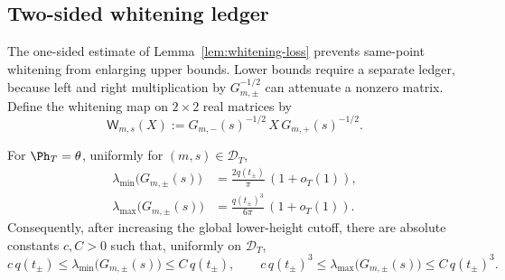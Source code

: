 %
%

\subsection{Two-sided whitening ledger}
\label{subsec:two-sided-whitening-ledger}

The one-sided estimate of Lemma~\ref{lem:whitening-loss} prevents
same-point whitening from enlarging upper bounds.  Lower bounds require a
separate ledger, because left and right multiplication by
\(G_{m,\pm}^{-1/2}\) can attenuate a nonzero matrix.  Define the whitening
map on \(2\times2\) real matrices by
\begin{equation}
\label{eq:whitening-map}
        \mathsf W_{m,s}(X)
        :=G_{m,-}(s)^{-1/2}\,X\,G_{m,+}(s)^{-1/2}.
\end{equation}

\begin{lemma}
\label{lem:finite-same-point-spectral-size}
For \(\Ph_T=\theta\), uniformly for \((m,s)\in\mathcal D_T\),
\begin{align}
\label{eq:G-lambda-min-asymptotic}
\lambda_{\min}\bigl(G_{m,\pm}(s)\bigr)
&=\frac{2q(t_\pm)}{\pi}\,(1+o_T(1)),\\
\label{eq:G-lambda-max-asymptotic}
\lambda_{\max}\bigl(G_{m,\pm}(s)\bigr)
&=\frac{q(t_\pm)^3}{6\pi}\,(1+o_T(1)).
\end{align}
Consequently, after increasing the global lower-height cutoff, there are
absolute constants \(c,C>0\) such that, uniformly on \(\mathcal D_T\),
\begin{equation}
\label{eq:G-spectral-comparable}
        c\,q(t_\pm)
        \le \lambda_{\min}\bigl(G_{m,\pm}(s)\bigr)
        \le C\,q(t_\pm),
        \qquad
        c\,q(t_\pm)^3
        \le \lambda_{\max}\bigl(G_{m,\pm}(s)\bigr)
        \le C\,q(t_\pm)^3.
\end{equation}
\end{lemma}

